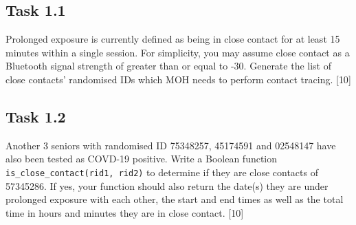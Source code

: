 \subsection*{Task 1.1 }

Prolonged exposure is currently defined as being in close contact
for at least 15 minutes within a single session. For simplicity, you
may assume close contact as a Bluetooth signal strength of greater
than or equal to -30. Generate the list of close contacts' randomised
IDs which MOH needs to perform contact tracing. \hfill{}{[}10{]}

\subsection*{Task 1.2 }

Another 3 seniors with randomised ID 75348257, 45174591 and 02548147
have also been tested as COVD-19 positive. Write a Boolean function
\texttt{is\_close\_contact(rid1, rid2)} to determine if they are close
contacts of 57345286. If yes, your function should also return the
date(s) they are under prolonged exposure with each other, the start
and end times as well as the total time in hours and minutes they
are in close contact. \hfill{}{[}10{]}